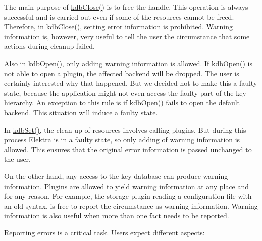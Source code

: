 \begin{DoxyItemize}
\item The main purpose of {\ttfamily \mbox{\hyperlink{group__kdb_gadb54dc9fda17ee07deb9444df745c96f}{kdb\+Close()}}} is to free the handle. This operation is always successful and is carried out even if some of the resources cannot be freed. Therefore, in {\ttfamily \mbox{\hyperlink{group__kdb_gadb54dc9fda17ee07deb9444df745c96f}{kdb\+Close()}}}, setting error information is prohibited. Warning information is, however, very useful to tell the user the circumstance that some actions during cleanup failed.
\item Also in {\ttfamily \mbox{\hyperlink{group__kdb_ga6808defe5870f328dd17910aacbdc6ca}{kdb\+Open()}}}, only adding warning information is allowed. If {\ttfamily \mbox{\hyperlink{group__kdb_ga6808defe5870f328dd17910aacbdc6ca}{kdb\+Open()}}} is not able to open a plugin, the affected backend will be dropped. The user is certainly interested why that happened. But we decided not to make this a faulty state, because the application might not even access the faulty part of the key hierarchy. An exception to this rule is if {\ttfamily \mbox{\hyperlink{group__kdb_ga6808defe5870f328dd17910aacbdc6ca}{kdb\+Open()}}} fails to open the default backend. This situation will induce a faulty state.
\item In {\ttfamily \mbox{\hyperlink{group__kdb_ga11436b058408f83d303ca5e996832bcf}{kdb\+Set()}}}, the clean-\/up of resources involves calling plugins. But during this process Elektra is in a faulty state, so only adding of warning information is allowed. This ensures that the original error information is passed unchanged to the user.
\end{DoxyItemize}

On the other hand, any access to the key database can produce warning information. Plugins are allowed to yield warning information at any place and for any reason. For example, the storage plugin reading a configuration file with an old syntax, is free to report the circumstance as warning information. Warning information is also useful when more than one fact needs to be reported.

Reporting errors is a critical task. Users expect different aspects\+:


